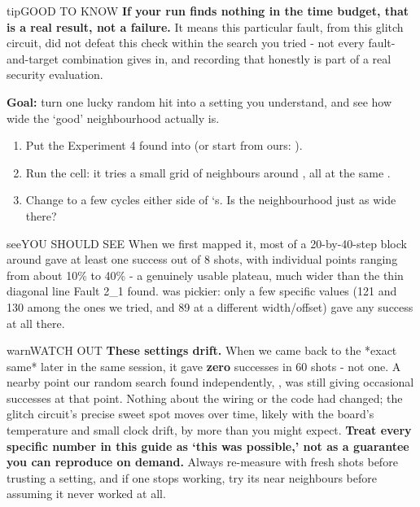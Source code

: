 \documentclass[11pt,letterpaper]{article}
\begin{document}
\begin{guidecallout}{tip}{GOOD TO KNOW}
\textbf{If your run finds nothing in the time budget, that is a real result, not a failure.} It means this particular
fault, from this glitch circuit, did not defeat this check within the search you tried - not every fault-and-target
combination gives in, and recording that honestly is part of a real security evaluation.
\end{guidecallout}


\textbf{Goal:} turn one lucky random hit into a setting you understand, and see how wide the `good' neighbourhood
actually is.

\begin{enumerate}[label=\arabic*.,leftmargin=1.8em,itemsep=2pt,topsep=2pt,parsep=0pt,start=1]
\item Put the  Experiment 4 found into  (or start from ours: ).
\item Run the cell: it tries a small grid of neighbours around , all at the same .
\item Change  to a few cycles either side of `s. Is the neighbourhood just as wide there?
\end{enumerate}

\begin{guidecallout}{see}{YOU SHOULD SEE}
When we first mapped it, most of a 20-by-40-step block around  gave at least one success out of 8
shots, with individual points ranging from about 10\% to 40\% - a genuinely usable plateau, much wider than the thin
diagonal line Fault 2\_1 found.  was pickier: only a few specific values (121 and 130 among the ones
we tried, and 89 at a different width/offset) gave any success at all there.
\end{guidecallout}

\begin{guidecallout}{warn}{WATCH OUT}
\textbf{These settings drift.} When we came back to the *exact same*  later in the same
session, it gave \textbf{zero} successes in 60 shots - not one. A nearby point our random search found independently,
, was still giving occasional successes at that point. Nothing about the wiring or the code
had changed; the glitch circuit's precise sweet spot moves over time, likely with the board's temperature and small
clock drift, by more than you might expect. \textbf{Treat every specific number in this guide as `this was possible,'
not as a guarantee you can reproduce on demand.} Always re-measure with fresh shots before trusting a setting, and if
one stops working, try its near neighbours before assuming it never worked at all.
\end{guidecallout}
\end{document}
